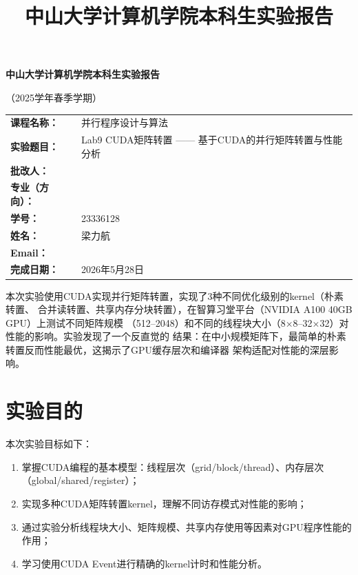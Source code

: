 \documentclass[UTF8,a4paper,12pt,fontset=none]{ctexart}
\title{\bfseries 中山大学计算机学院本科生实验报告}
\author{}
\date{}
\begin{document}
\begin{titlepage}
  \centering
  {\bfseries 中山大学计算机学院本科生实验报告\par}
  \vspace{0.5em}
  {（2025学年春季学期）\par}
  \vspace{2em}

  \begin{tabularx}{0.9\textwidth}{>{\bfseries}p{4cm}X}
    课程名称： & 并行程序设计与算法 \\
    实验题目： & Lab9 CUDA矩阵转置 —— 基于CUDA的并行矩阵转置与性能分析 \\
    批改人： & \\
    专业（方向）： & \\
    学号： & 23336128 \\
    姓名： & 梁力航 \\
    Email： & \\
    完成日期： & 2026年5月28日 \\
  \end{tabularx}

  \vfill
  \begin{minipage}{0.88\textwidth}
    \small
    本次实验使用CUDA实现并行矩阵转置，实现了3种不同优化级别的kernel（朴素转置、
    合并读转置、共享内存分块转置），在智算习堂平台（NVIDIA A100 40GB GPU）上测试不同矩阵规模
    （512--2048）和不同的线程块大小（8×8--32×32）对性能的影响。实验发现了一个反直觉的
    结果：在中小规模矩阵下，最简单的朴素转置反而性能最优，这揭示了GPU缓存层次和编译器
    架构适配对性能的深层影响。
  \end{minipage}
\end{titlepage}

\section{实验目的}

本次实验目标如下：
\begin{enumerate}[leftmargin=2.2em]
  \item 掌握CUDA编程的基本模型：线程层次（grid/block/thread）、内存层次（global/shared/register）；
  \item 实现多种CUDA矩阵转置kernel，理解不同访存模式对性能的影响；
  \item 通过实验分析线程块大小、矩阵规模、共享内存使用等因素对GPU程序性能的作用；
  \item 学习使用CUDA Event进行精确的kernel计时和性能分析。
\end{enumerate}
\end{document}
